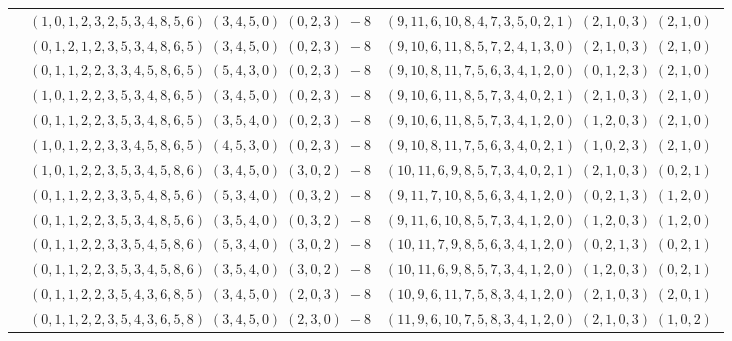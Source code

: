 \documentclass[11pt]{article}
\begin{document}
\begin{longtable}[l]{|c|c|c|}
 \cline{2-3} 
 & $(1 ,0 ,1 ,2 ,3 ,2 ,5 ,3 ,4 ,8 ,5 ,6) \;(3 ,4 ,5 ,0) \;(0 ,2 ,3) \;-8$ & $(9 ,11 ,6 ,10 ,8 ,4 ,7 ,3 ,5 ,0 ,2 ,1) \;(2 ,1 ,0 ,3) \;(2 ,1 ,0) \;$\\ 
 \cline{2-3} 
 & $(0 ,1 ,2 ,1 ,2 ,3 ,5 ,3 ,4 ,8 ,6 ,5) \;(3 ,4 ,5 ,0) \;(0 ,2 ,3) \;-8$ & $(9 ,10 ,6 ,11 ,8 ,5 ,7 ,2 ,4 ,1 ,3 ,0) \;(2 ,1 ,0 ,3) \;(2 ,1 ,0) \;$\\ 
 \cline{2-3} 
 & $(0 ,1 ,1 ,2 ,2 ,3 ,3 ,4 ,5 ,8 ,6 ,5) \;(5 ,4 ,3 ,0) \;(0 ,2 ,3) \;-8$ & $(9 ,10 ,8 ,11 ,7 ,5 ,6 ,3 ,4 ,1 ,2 ,0) \;(0 ,1 ,2 ,3) \;(2 ,1 ,0) \;$\\ 
 \cline{2-3} 
 & $(1 ,0 ,1 ,2 ,2 ,3 ,5 ,3 ,4 ,8 ,6 ,5) \;(3 ,4 ,5 ,0) \;(0 ,2 ,3) \;-8$ & $(9 ,10 ,6 ,11 ,8 ,5 ,7 ,3 ,4 ,0 ,2 ,1) \;(2 ,1 ,0 ,3) \;(2 ,1 ,0) \;$\\ 
 \cline{2-3} 
 & $(0 ,1 ,1 ,2 ,2 ,3 ,5 ,3 ,4 ,8 ,6 ,5) \;(3 ,5 ,4 ,0) \;(0 ,2 ,3) \;-8$ & $(9 ,10 ,6 ,11 ,8 ,5 ,7 ,3 ,4 ,1 ,2 ,0) \;(1 ,2 ,0 ,3) \;(2 ,1 ,0) \;$\\ 
 \cline{2-3} 
 & $(1 ,0 ,1 ,2 ,2 ,3 ,3 ,4 ,5 ,8 ,6 ,5) \;(4 ,5 ,3 ,0) \;(0 ,2 ,3) \;-8$ & $(9 ,10 ,8 ,11 ,7 ,5 ,6 ,3 ,4 ,0 ,2 ,1) \;(1 ,0 ,2 ,3) \;(2 ,1 ,0) \;$\\ 
 \cline{2-3} 
 & $(1 ,0 ,1 ,2 ,2 ,3 ,5 ,3 ,4 ,5 ,8 ,6) \;(3 ,4 ,5 ,0) \;(3 ,0 ,2) \;-8$ & $(10 ,11 ,6 ,9 ,8 ,5 ,7 ,3 ,4 ,0 ,2 ,1) \;(2 ,1 ,0 ,3) \;(0 ,2 ,1) \;$\\ 
 \cline{2-3} 
 & $(0 ,1 ,1 ,2 ,2 ,3 ,3 ,5 ,4 ,8 ,5 ,6) \;(5 ,3 ,4 ,0) \;(0 ,3 ,2) \;-8$ & $(9 ,11 ,7 ,10 ,8 ,5 ,6 ,3 ,4 ,1 ,2 ,0) \;(0 ,2 ,1 ,3) \;(1 ,2 ,0) \;$\\ 
 \cline{2-3} 
 & $(0 ,1 ,1 ,2 ,2 ,3 ,5 ,3 ,4 ,8 ,5 ,6) \;(3 ,5 ,4 ,0) \;(0 ,3 ,2) \;-8$ & $(9 ,11 ,6 ,10 ,8 ,5 ,7 ,3 ,4 ,1 ,2 ,0) \;(1 ,2 ,0 ,3) \;(1 ,2 ,0) \;$\\ 
 \cline{2-3} 
 & $(0 ,1 ,1 ,2 ,2 ,3 ,3 ,5 ,4 ,5 ,8 ,6) \;(5 ,3 ,4 ,0) \;(3 ,0 ,2) \;-8$ & $(10 ,11 ,7 ,9 ,8 ,5 ,6 ,3 ,4 ,1 ,2 ,0) \;(0 ,2 ,1 ,3) \;(0 ,2 ,1) \;$\\ 
 \cline{2-3} 
 & $(0 ,1 ,1 ,2 ,2 ,3 ,5 ,3 ,4 ,5 ,8 ,6) \;(3 ,5 ,4 ,0) \;(3 ,0 ,2) \;-8$ & $(10 ,11 ,6 ,9 ,8 ,5 ,7 ,3 ,4 ,1 ,2 ,0) \;(1 ,2 ,0 ,3) \;(0 ,2 ,1) \;$\\ 
 \cline{2-3} 
 & $(0 ,1 ,1 ,2 ,2 ,3 ,5 ,4 ,3 ,6 ,8 ,5) \;(3 ,4 ,5 ,0) \;(2 ,0 ,3) \;-8$ & $(10 ,9 ,6 ,11 ,7 ,5 ,8 ,3 ,4 ,1 ,2 ,0) \;(2 ,1 ,0 ,3) \;(2 ,0 ,1) \;$\\ 
 \cline{2-3} 
 & $(0 ,1 ,1 ,2 ,2 ,3 ,5 ,4 ,3 ,6 ,5 ,8) \;(3 ,4 ,5 ,0) \;(2 ,3 ,0) \;-8$ & $(11 ,9 ,6 ,10 ,7 ,5 ,8 ,3 ,4 ,1 ,2 ,0) \;(2 ,1 ,0 ,3) \;(1 ,0 ,2) \;$\\ 

\end{longtable}
\end{document}
